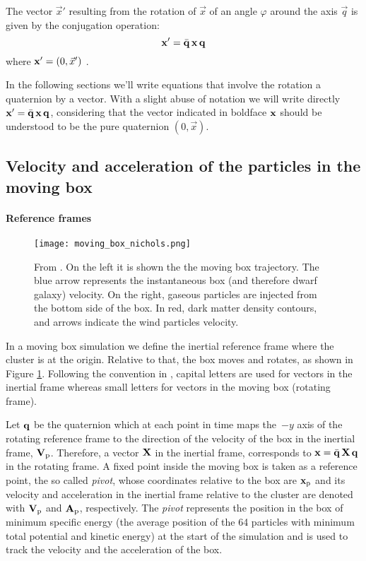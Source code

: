 The vector $\vec x'$ resulting from the rotation of $\vec x$ of an angle $\varphi$ around the axis $\vec q$ is given by the conjugation operation:
\begin{equation}
\boldsymbol{\mathbf{x}}' = \bar{\mathbf{q}}\, \boldsymbol{\mathbf{x}} \, \mathbf{q}
\end{equation}
where $\boldsymbol{\mathbf{x}}' = (0, \vec x')$ \citep[for a proof, see e.g.][sec. 1.4]{Graf2008}.

In the following sections we'll write equations that involve the rotation a quaternion by a vector.
With a slight abuse of notation we will write directly $\boldsymbol{\mathbf{x}}' = \bar{\mathbf{q}}\, \boldsymbol{\mathbf{x}} \, \mathbf{q}$, considering that the vector indicated in boldface $\boldsymbol{\mathbf{x}}$ should be understood to be the pure quaternion $(0, \vec x)$.%



\subsection{Velocity and acceleration of the particles in the moving box}
\paragraph{Reference frames}
\begin{figure}[H]
 \centering
 \texttt{[image: moving\_box\_nichols.png]}
 \caption{From \citet{Nichols2015}. On the left it is shown the the moving box trajectory. The blue arrow represents the instantaneous box (and therefore dwarf galaxy) velocity.
 On the right, gaseous particles are injected from the bottom side of the box. In red, dark matter density contours, and arrows indicate the wind particles velocity.}
 \label{fig:mb_nichols}
\end{figure}
In a moving box simulation we define the inertial reference frame where the cluster is at the origin.
Relative to that, the box moves and rotates, as shown in Figure \ref{fig:mb_nichols}.
Following the convention in \citet{Nichols2015}, capital letters are used for vectors in the inertial frame whereas small letters for vectors in the moving box (rotating frame).

Let $\mathbf{q}$ be the quaternion which at each point in time maps the~$-y$ axis of the rotating reference frame to the direction of the velocity of the box in the inertial frame, $\boldsymbol{\mathbf{V}}_{\mathrm p}$.
Therefore, a vector $\boldsymbol{\mathbf{X}}$ in the inertial frame, corresponds to $\boldsymbol{\mathbf{x}} = \bar{\mathbf{q}}\, \boldsymbol{\mathbf{X}} \,\mathbf{q} $ in the rotating frame.
A fixed point inside the moving box is taken as a reference point, the so called \emph{pivot}, whose coordinates relative to the box are $\boldsymbol{\mathbf{x}}_{\mathrm p}$ and its velocity and acceleration in the inertial frame relative to the cluster are denoted with $\boldsymbol{\mathbf{V}}_{\mathrm p}$ and $\boldsymbol{\mathbf{A}}_{\mathrm p}$, respectively.
The \emph{pivot} represents the position in the box of minimum specific energy (the average position of the 64 particles with minimum total potential and kinetic energy) at the start of the simulation and is used to track the velocity and the acceleration of the box.

